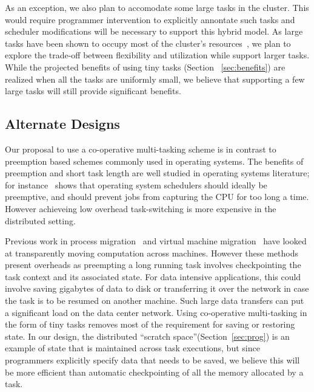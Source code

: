 As an exception, we also plan to accomodate some large tasks in the cluster.
This would require programmer intervention to explicitly annontate such tasks
and scheduler modifications will be necessary to support this hybrid model.  As
large tasks have been shown to occupy most of the cluster's
resources~\cite{something}, we plan to explore the trade-off between flexibility
and utilization while support larger tasks.  While the projected benefits of
using tiny tasks (Section ~\ref{sec:benefits}) are realized when all the tasks
are uniformly small, we believe that supporting a few large tasks will still
provide significant benefits.


\subsection{Alternate Designs}
Our proposal to use a co-operative multi-tasking scheme is in contrast to
preemption based schemes commonly used in operating systems. The benefits of 
preemption and short task length are well studied in operating
systems literature; for instance~\cite{sherman1972trace} shows that operating
system schedulers should ideally be preemptive, and should prevent jobs from
capturing the CPU for too long a time. However achieveing low overhead
task-switching is more expensive in the distributed setting. 

Previous work in process
migration~\cite{douglis1991transparent,milojivcic2000process} and virtual
machine migration~\cite{xen-vm-move} have looked at transparently moving
computation across machines. However these methods present overheads as
preempting a long running task involves checkpointing the task context and its
associated state. For data intensive applications, this could involve saving
gigabytes of data to disk or transferring it over the network in case the task
is to be resumed on another machine. Such large data transfers can put a
significant load on the data center network. Using co-operative multi-tasking in
the form of tiny tasks removes most of the requirement for saving or restoring
state.  In our design, the distributed ``scratch space''(Section~\ref{sec:prog})
is an example of state that is maintained across task executions, but since
programmers explicitly specify data that needs to be saved, we believe this will
be more efficient than automatic checkpointing of all the memory allocated by a
task. 


